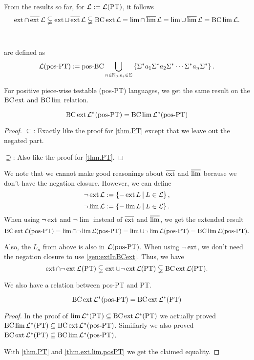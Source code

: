 From the results so far, for $\mathcal{L} := \mathcal{L}(\textup{\textrm{PT}})$, it follows
\[ \operatorname{ext} \cap \operatorname{\overline{ext}} \mathcal{L} \subsetneqq
\operatorname{ext} \cup \operatorname{\overline{ext}} \mathcal{L} \subsetneqq
\operatorname{BC} \operatorname{ext} \mathcal{L} =
\lim \cap \operatorname{\overline{lim}} \mathcal{L} =
\lim \cup \operatorname{\overline{lim}} \mathcal{L} =
\operatorname{BC} \lim \mathcal{L} . \]

\

\label{lang:posPT}
 are defined as
\[ \Lang(\mathtext{pos-PT}) := \operatorname{pos-BC} \bigcup_{n\in\N_0,a_i \in \Sigma} \Set{\Sigma^* a_1 \Sigma^* a_2 \Sigma^* \cdots\Sigma^* a_n \Sigma^*} . \]

For positive piece-wise testable (pos-PT) languages, we get the same result on the $\operatorname{BC} \operatorname{ext}$ and $\operatorname{BC} \lim$ relation.

\begin{theorem}
\label{thm.ext.lim.posPT}
\[ \operatorname{BC} \operatorname{ext} \mathcal{L}^* (\textup{\textrm{pos-PT}}) = \operatorname{BC} \lim \mathcal{L}^* (\textup{\textrm{pos-PT}}) \]
\begin{proof}
$\subseteq$: Exactly like the proof for \cref{thm.PT} except that we leave out the negated part.

$\supseteq$: Also like the proof for \cref{thm.PT}.
\end{proof}
\end{theorem}

We note that we cannot make good reasonings about $\operatorname{\overline{ext}}$ and $\operatorname{\overline{lim}}$ because we don't have the negation closure. However, we can define
\[ \neg\ext \Lang := \Set{-\ext L}{L \in \Lang} , \]
\[ \neg\lim \Lang := \Set{-\lim L}{L \in \Lang} . \]
When using $\neg\operatorname{ext}$ and $\neg\lim$ instead of $\operatorname{\overline{ext}}$ and $\operatorname{\overline{lim}}$, we get the extended result
\[ \operatorname{BC} \operatorname{ext} \mathcal{L}(\textup{\textrm{pos-PT}}) =
\lim \cap \neg\lim \mathcal{L}(\textup{\textrm{pos-PT}}) =
\lim \cup \neg\lim \mathcal{L}(\textup{\textrm{pos-PT}}) =
\operatorname{BC} \lim \mathcal{L}(\textup{\textrm{pos-PT}}) .\]

Also, the $L_a$ from above is also in $\mathcal{L}(\textup{\textrm{pos-PT}})$. When using $\neg\operatorname{ext}$, we don't need the negation closure to use \cref{gen:extInBCext}. Thus, we have
\[ \operatorname{ext} \cap \neg\operatorname{ext} \mathcal{L}(\textup{\textrm{PT}}) \subsetneqq
\operatorname{ext} \cup \neg\operatorname{ext} \mathcal{L}(\textup{\textrm{PT}}) \subsetneqq
\operatorname{BC} \operatorname{ext} \mathcal{L}(\textup{\textrm{PT}}) . \]

We also have a relation between pos-PT and PT.

\begin{lemma}
\[ \operatorname{BC} \operatorname{ext} \mathcal{L}^*(\textup{\textrm{pos-PT}}) = \operatorname{BC} \operatorname{ext} \mathcal{L}^* (\textup{\textrm{PT}}) \]

\begin{proof}
In the proof of $\lim \mathcal{L}^*(\textup{\textrm{PT}}) \subseteq \operatorname{BC} \operatorname{ext} \mathcal{L}^* (\textup{\textrm{PT}})$ we actually proved $\operatorname{BC} \lim \mathcal{L}^*(\textup{\textrm{PT}}) \subseteq \operatorname{BC} \operatorname{ext} \mathcal{L}^* (\textup{\textrm{pos-PT}})$. Similiarly we also proved $\operatorname{BC} \operatorname{ext} \mathcal{L}^* (\textup{\textrm{PT}}) \subseteq \operatorname{BC} \lim \mathcal{L}^* (\textup{\textrm{pos-PT}})$.

With \cref{thm.PT} and \cref{thm.ext.lim.posPT} we get the claimed equality.
\end{proof}
\end{lemma}

